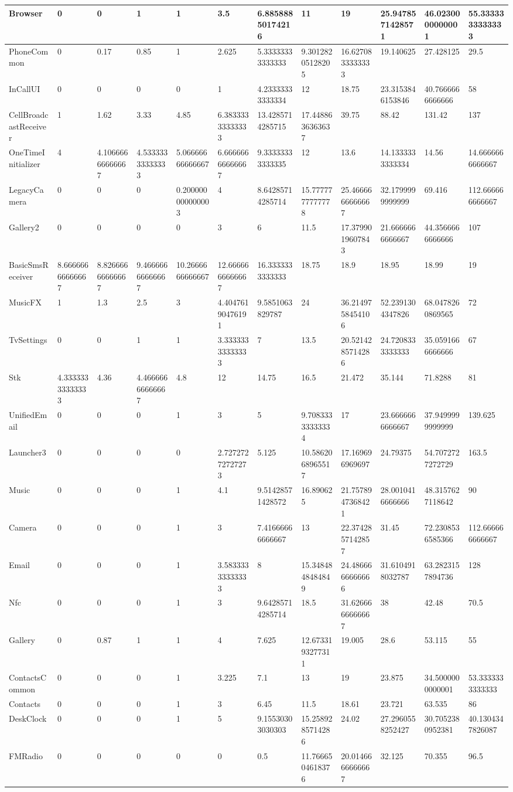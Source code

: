 \begin{tabular}{|l|l|l|l|l|l|l|l|l|l|l|l|}
Browser&0&0&1&1&3.5&6.88588850174216&11&19&25.9478571428571&46.0230000000001&55.3333333333333\\
\hline
PhoneCommon&0&0.17&0.85&1&2.625&5.33333333333333&9.30128205128205&16.6270833333333&19.140625&27.428125&29.5\\
\hline
InCallUI&0&0&0&0&1&4.23333333333334&12&18.75&23.3153846153846&40.7666666666666&58\\
\hline
CellBroadcastReceiver&1&1.62&3.33&4.85&6.38333333333333&13.4285714285715&17.4488636363637&39.75&88.42&131.42&137\\
\hline
OneTimeInitializer&4&4.10666666666667&4.53333333333333&5.06666666666667&6.66666666666667&9.33333333333335&12&13.6&14.1333333333334&14.56&14.6666666666667\\
\hline
LegacyCamera&0&0&0&0.200000000000003&4&8.64285714285714&15.7777777777778&25.4666666666667&32.1799999999999&69.416&112.666666666667\\
\hline
Gallery2&0&0&0&0&3&6&11.5&17.3799019607843&21.6666666666667&44.3566666666666&107\\
\hline
BasicSmsReceiver&8.66666666666667&8.82666666666667&9.46666666666667&10.2666666666667&12.6666666666667&16.3333333333333&18.75&18.9&18.95&18.99&19\\
\hline
MusicFX&1&1.3&2.5&3&4.40476190476191&9.5851063829787&24&36.2149758454106&52.2391304347826&68.0478260869565&72\\
\hline
TvSettings&0&0&1&1&3.33333333333333&7&13.5&20.5214285714286&24.7208333333333&35.0591666666666&67\\
\hline
Stk&4.33333333333333&4.36&4.46666666666667&4.8&12&14.75&16.5&21.472&35.144&71.8288&81\\
\hline
UnifiedEmail&0&0&0&1&3&5&9.70833333333334&17&23.6666666666667&37.9499999999999&139.625\\
\hline
Launcher3&0&0&0&0&2.72727272727273&5.125&10.5862068965517&17.169696969697&24.79375&54.7072727272729&163.5\\
\hline
Music&0&0&0&1&4.1&9.51428571428572&16.890625&21.7578947368421&28.0010416666666&48.3157627118642&90\\
\hline
Camera&0&0&0&1&3&7.41666666666667&13&22.3742857142857&31.45&72.2308536585366&112.666666666667\\
\hline
Email&0&0&0&1&3.58333333333333&8&15.3484848484849&24.4866666666666&31.6104918032787&63.2823157894736&128\\
\hline
Nfc&0&0&0&1&3&9.64285714285714&18.5&31.6266666666667&38&42.48&70.5\\
\hline
Gallery&0&0.87&1&1&4&7.625&12.6733193277311&19.005&28.6&53.115&55\\
\hline
ContactsCommon&0&0&0&1&3.225&7.1&13&19&23.875&34.5000000000001&53.3333333333333\\
\hline
Contacts&0&0&0&1&3&6.45&11.5&18.61&23.721&63.535&86\\
\hline
DeskClock&0&0&0&1&5&9.15530303030303&15.2589285714286&24.02&27.2960558252427&30.7052380952381&40.1304347826087\\
\hline
FMRadio&0&0&0&0&0&0.5&11.7666504618376&20.0146666666667&32.125&70.355&96.5\\
\hline
\end{tabular}
